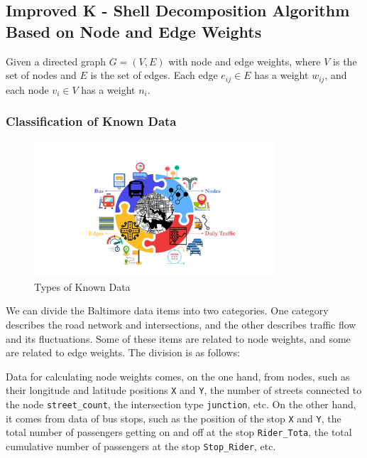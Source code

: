 \documentclass{mcmthesis}
\begin{document}
\subsection{Improved K - Shell Decomposition Algorithm Based on Node and Edge Weights}
\label{sec:improvedKshell}

Given a directed graph \(G=(V, E)\) with node and edge weights, where \(V\) is the set of nodes and \(E\) is the set of edges. Each edge \(e_{ij}\in E\) has a weight \(w_{ij}\), and each node \(v_i\in V\) has a weight \(n_i\).

\subsubsection{Classification of Known Data}

\begin{figure}[H]
  \centering
  \includegraphics[width=0.8\textwidth]{figures/data.pdf}
  \caption{Types of Known Data}
  \label{fig:data}
\end{figure}

We can divide the Baltimore data items into two categories. One category describes the road network and intersections, and the other describes traffic flow and its fluctuations. Some of these items are related to node weights, and some are related to edge weights. The division is as follows:

Data for calculating node weights comes, on the one hand, from nodes, such as their longitude and latitude positions \texttt{X} and \texttt{Y}, the number of streets connected to the node \texttt{street\_count}, the intersection type \texttt{junction}, etc. On the other hand, it comes from data of bus stops, such as the position of the stop \texttt{X} and \texttt{Y}, the total number of passengers getting on and off at the stop \texttt{Rider\_Tota}, the total cumulative number of passengers at the stop \texttt{Stop\_Rider}, etc.
\end{document}
